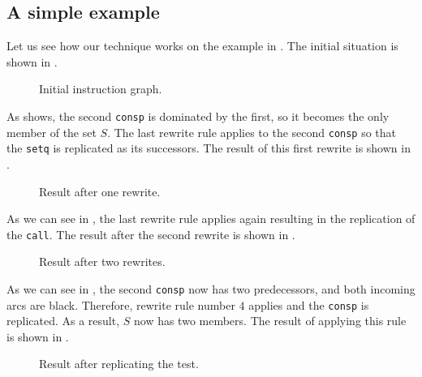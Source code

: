 \subsection{A simple example}
\label{sec-our-technique-example}

Let us see how our technique works on the example in
.  The initial situation is shown in
.

\begin{figure}
\begin{center}
\end{center}
\caption{\label{fig-rewrite-1}
Initial instruction graph.}
\end{figure}

As  shows, the second \texttt{consp} is
dominated by the first, so it becomes the only member of the set $S$.
The last rewrite rule applies to the second \texttt{consp} so that the
\texttt{setq} is replicated as its successors.  The result of this
first rewrite is shown in .

\begin{figure}
\begin{center}
\end{center}
\caption{\label{fig-rewrite-one-and-a-half}
Result after one rewrite.}
\end{figure}

As we can see in , the last rewrite
rule applies again resulting in the replication of the \texttt{call}.
The result after the second rewrite is shown in
.

\begin{figure}
\begin{center}
\end{center}
\caption{\label{fig-rewrite-2}
Result after two rewrites.}
\end{figure}

As we can see in , the second \texttt{consp}
now has two predecessors, and both incoming arcs are black.
Therefore, rewrite rule number $4$ applies and the \texttt{consp} is
replicated.  As a result, $S$ now has two members.  The result of
applying this rule is shown in .

\begin{figure}
\begin{center}
\end{center}
\caption{\label{fig-rewrite-3}
Result after replicating the test.}
\end{figure}

